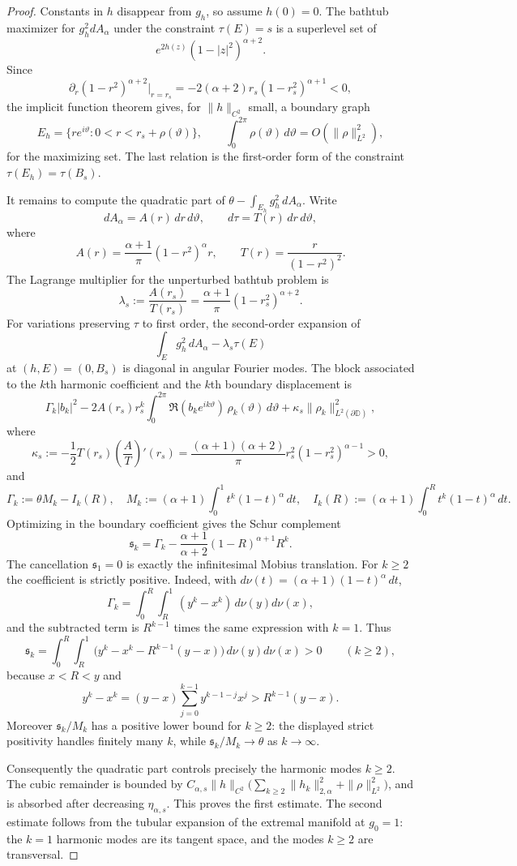 \documentclass[a4paper,10pt]{amsart}
\newcommand{\D}{\mathbb{D}}
\begin{document}
\begin{proof}
Constants in $h$ disappear from $g_h$, so assume $h(0)=0$. The bathtub
maximizer for $g_h^2dA_\alpha$ under the constraint $\tau(E)=s$ is a superlevel
set of
\[
e^{2h(z)}(1-|z|^2)^{\alpha+2}.
\]
Since
\[
\partial_r(1-r^2)^{\alpha+2}\big|_{r=r_s}
=-2(\alpha+2)r_s(1-r_s^2)^{\alpha+1}<0,
\]
the implicit function theorem gives, for $\|h\|_{C^2}$ small, a boundary graph
\[
E_h=\{re^{i\vartheta}:0<r<r_s+\rho(\vartheta)\},
\qquad
\int_0^{2\pi}\rho(\vartheta)\,d\vartheta=O(\|\rho\|_{L^2}^2),
\]
for the maximizing set. The last relation is the first-order form of the
constraint $\tau(E_h)=\tau(B_s)$.

It remains to compute the quadratic part of
$\theta-\int_{E_h}g_h^2\,dA_\alpha$. Write
\[
dA_\alpha=A(r)\,dr\,d\vartheta,\qquad
d\tau=T(r)\,dr\,d\vartheta,
\]
where
\[
A(r)=\frac{\alpha+1}{\pi}(1-r^2)^\alpha r,
\qquad
T(r)=\frac{r}{(1-r^2)^2}.
\]
The Lagrange multiplier for the unperturbed bathtub problem is
\[
\lambda_s:=\frac{A(r_s)}{T(r_s)}
=\frac{\alpha+1}{\pi}(1-r_s^2)^{\alpha+2}.
\]
For variations preserving $\tau$ to first order, the second-order expansion of
\[
\int_E g_h^2\,dA_\alpha-\lambda_s\tau(E)
\]
at $(h,E)=(0,B_s)$ is diagonal in angular Fourier modes. The block associated
to the $k$th harmonic coefficient and the $k$th boundary displacement is
\[
\Gamma_k |b_k|^2
-2A(r_s)r_s^k
\int_0^{2\pi}\Re(b_ke^{ik\vartheta})\,\rho_k(\vartheta)\,d\vartheta
+\kappa_s\|\rho_k\|_{L^2(\partial\D)}^2,
\]
where
\[
\kappa_s
:=
-\frac12 T(r_s)\left(\frac{A}{T}\right)'(r_s)
=
\frac{(\alpha+1)(\alpha+2)}{\pi}
r_s^2(1-r_s^2)^{\alpha-1}>0,
\]
and
\[
\Gamma_k
:=
\theta M_k-I_k(R),
\quad
M_k:=(\alpha+1)\int_0^1 t^k(1-t)^\alpha\,dt,
\quad
I_k(R):=(\alpha+1)\int_0^R t^k(1-t)^\alpha\,dt .
\]
Optimizing in the boundary coefficient gives the Schur complement
\[
\mathfrak s_k
=
\Gamma_k
-
\frac{\alpha+1}{\alpha+2}(1-R)^{\alpha+1}R^k .
\]
The cancellation $\mathfrak s_1=0$ is exactly the infinitesimal Mobius
translation. For $k\ge2$ the coefficient is strictly positive. Indeed, with
$d\nu(t)=(\alpha+1)(1-t)^\alpha\,dt$,
\[
\Gamma_k
=
\int_0^R\int_R^1 (y^k-x^k)\,d\nu(y)d\nu(x),
\]
and the subtracted term is $R^{k-1}$ times the same expression with $k=1$.
Thus
\[
\mathfrak s_k
=
\int_0^R\int_R^1
\bigl(y^k-x^k-R^{k-1}(y-x)\bigr)\,d\nu(y)d\nu(x)>0
\qquad (k\ge2),
\]
because $x<R<y$ and
\[
y^k-x^k=(y-x)\sum_{j=0}^{k-1}y^{k-1-j}x^j
>R^{k-1}(y-x).
\]
Moreover $\mathfrak s_k/M_k$ has a positive lower bound for $k\ge2$: the
displayed strict positivity handles finitely many $k$, while
$\mathfrak s_k/M_k\to\theta$ as $k\to\infty$.

Consequently the quadratic part controls precisely the harmonic modes
$k\ge2$. The cubic remainder is bounded by
$C_{\alpha,s}\|h\|_{C^2}\bigl(\sum_{k\ge2}\|h_k\|_{2,\alpha}^2+
\|\rho\|_{L^2}^2\bigr)$, and is absorbed after decreasing
$\eta_{\alpha,s}$. This proves the first estimate. The second estimate follows
from the tubular expansion of the extremal manifold at $g_0=1$:
the $k=1$ harmonic modes are its tangent space, and the modes $k\ge2$ are
transversal.
\end{proof}
\end{document}
